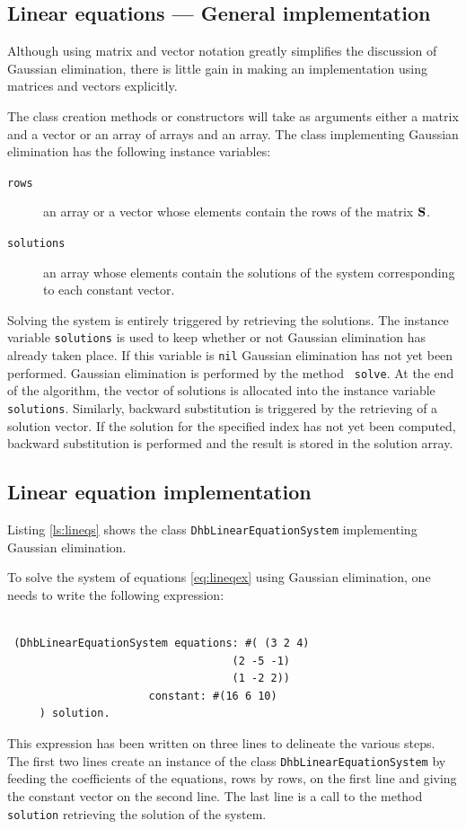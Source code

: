 \documentclass[twoside]{book}
\begin{document}
\subsection{Linear equations --- General implementation}
 Although using matrix and vector
notation greatly simplifies the discussion of Gaussian
elimination, there is little gain in making an implementation
using matrices and vectors explicitly.

The class creation methods or constructors will take as arguments
either a matrix and a vector or an array of arrays and an array.
The class implementing Gaussian elimination has the following
instance variables:
\begin{description}
  \item[\texttt{rows}] an array or a vector whose elements contain the rows of the
  matrix ${\bf S}$.
  \item[\tt solutions] an array whose elements contain the solutions of the
  system corresponding to each constant vector.
\end{description}

Solving the system is entirely triggered by retrieving the
solutions. The instance variable {\tt solutions} is used to keep
whether or not Gaussian elimination has already taken place. If
this variable is {\tt nil} Gaussian elimination has not yet been
performed. Gaussian elimination is performed by the method {\tt
solve}. At the end of the algorithm, the vector of solutions is
allocated into the instance variable {\tt solutions}. Similarly,
backward substitution is triggered by the retrieving of a solution
vector. If the solution for the specified index has not yet been
computed, backward substitution is performed and the result is
stored in the solution array.

\subsection{Linear equation implementation}
Listing \ref{ls:lineqs} shows the class {\tt DhbLinearEquationSystem} implementing Gaussian elimination.

To solve the system of equations \ref{eq:lineqex} using Gaussian elimination, one needs to write the following expression:
\begin{codeExample}
\begin{verbatim}

 (DhbLinearEquationSystem equations: #( (3 2 4)
                                   (2 -5 -1)
                                   (1 -2 2))
                      constant: #(16 6 10)
     ) solution.
\end{verbatim}
\end{codeExample}
This expression has been written on three lines to delineate the
various steps. The first two lines create an instance of the class
{\tt DhbLinearEquationSystem} by feeding the coefficients of the
equations, rows by rows, on the first line and giving the constant
vector on the second line. The last line is a call to the method
{\tt solution} retrieving the solution of the system.
\end{document}
